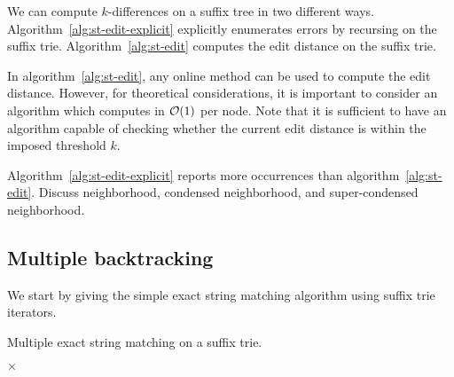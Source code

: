 We can compute $k$-differences on a suffix tree in two different ways. Algorithm~\ref{alg:st-edit-explicit} explicitly enumerates errors by recursing on the suffix trie. Algorithm~\ref{alg:st-edit} computes the edit distance on the suffix trie.

%

In algorithm~\ref{alg:st-edit}, any online method can be used to compute the edit distance.
However, for theoretical considerations, it is important to consider an algorithm which computes in $\mathcal{O}(1)$ per node.
Note that it is sufficient to have an algorithm capable of checking whether the current edit distance is within the imposed threshold $k$.

Algorithm~\ref{alg:st-edit-explicit} reports more occurrences than algorithm~\ref{alg:st-edit}.
Discuss neighborhood, condensed neighborhood, and super-condensed neighborhood.


\subsection{Multiple backtracking}

We start by giving the simple exact string matching algorithm using suffix trie iterators.

\begin{algorithm}[h]
\caption{Multiple exact string matching on a suffix trie.}
\label{alg:st-exact-multi}
\begin{algorithmic}[1]
		\State \Report {} $\times$ 
	\Else
		\State {}
		\Repeat
				\State {}
				\State {}
			\EndIf
	\EndIf
\EndProcedure
\end{algorithmic}
\end{algorithm}

